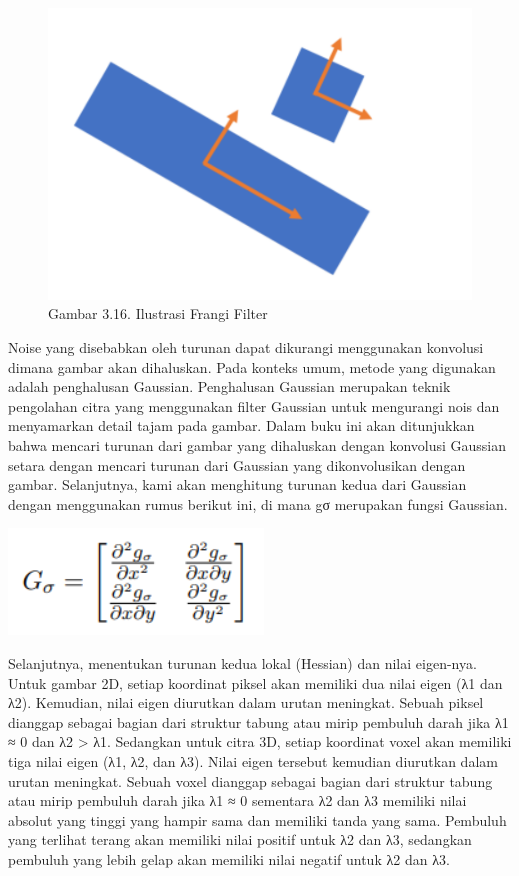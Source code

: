\documentclass[
  letterpaper,
  DIV=11,
  numbers=noendperiod]{scrreprt}
\begin{document}
\begin{figure}

{\centering \includegraphics{Asset/image1125.png}

}

\caption{Gambar 3.16. Ilustrasi Frangi Filter}

\end{figure}

Noise yang disebabkan oleh turunan dapat dikurangi menggunakan konvolusi
dimana gambar akan dihaluskan. Pada konteks umum, metode yang digunakan
adalah penghalusan Gaussian. Penghalusan Gaussian merupakan teknik
pengolahan citra yang menggunakan filter Gaussian untuk mengurangi nois
dan menyamarkan detail tajam pada gambar. Dalam buku ini akan
ditunjukkan bahwa mencari turunan dari gambar yang dihaluskan dengan
konvolusi Gaussian setara dengan mencari turunan dari Gaussian yang
dikonvolusikan dengan gambar. Selanjutnya, kami akan menghitung turunan
kedua dari Gaussian dengan menggunakan rumus berikut ini, di mana gσ
merupakan fungsi Gaussian.

\includegraphics{Asset/image1126.png}

Selanjutnya, menentukan turunan kedua lokal (Hessian) dan nilai
eigen-nya. Untuk gambar 2D, setiap koordinat piksel akan memiliki dua
nilai eigen (λ1 dan λ2). Kemudian, nilai eigen diurutkan dalam urutan
meningkat. Sebuah piksel dianggap sebagai bagian dari struktur tabung
atau mirip pembuluh darah jika λ1 ≈ 0 dan \textbar λ2\textbar{}
\textgreater{} \textbar λ1\textbar. Sedangkan untuk citra 3D, setiap
koordinat voxel akan memiliki tiga nilai eigen (λ1, λ2, dan λ3). Nilai
eigen tersebut kemudian diurutkan dalam urutan meningkat. Sebuah voxel
dianggap sebagai bagian dari struktur tabung atau mirip pembuluh darah
jika λ1 ≈ 0 sementara λ2 dan λ3 memiliki nilai absolut yang tinggi yang
hampir sama dan memiliki tanda yang sama. Pembuluh yang terlihat terang
akan memiliki nilai positif untuk λ2 dan λ3, sedangkan pembuluh yang
lebih gelap akan memiliki nilai negatif untuk λ2 dan λ3.
\end{document}
